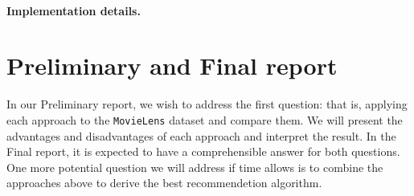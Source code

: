 \documentclass[bj, preprint]{imsart}
\begin{document}
\paragraph{Implementation details.}\label{par:method.models.rbm.impl}





\section{Preliminary and Final report}\label{sec:report}
In our Preliminary report, we wish to address the first question: that is, applying each approach to the \texttt{MovieLens} dataset and compare them. We will present the advantages and disadvantages of each approach and interpret the result. In the Final report, it is expected to have a comprehensible answer for both questions. One more potential question we will address if time allows is to combine the approaches above to derive the best recommendetion algorithm. 


{}
\end{document}
